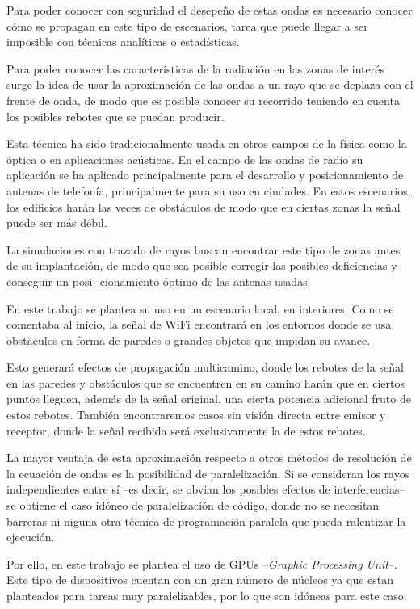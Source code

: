 Para poder conocer con seguridad el desepeño de estas ondas es necesario conocer cómo se propagan en este tipo de escenarios, tarea que puede llegar a ser imposible con técnicas analíticas o estadísticas.

Para poder conocer las características de la radiación en las zonas de interés surge la idea de usar la aproximación de las ondas a un rayo que se deplaza con el frente de onda, de modo que es posible conocer su recorrido teniendo en cuenta los posibles rebotes que se puedan producir. 

Esta técnica ha sido tradicionalmente usada en otros campos de la física como la óptica o en aplicaciones acústicas.
En el campo de las ondas de radio su aplicación se ha aplicado principalmente para el desarrollo y posicionamiento de antenas de telefonía, principalmente para su uso en ciudades. En estos escenarios, los edificios harán las veces de obstáculos de modo que en ciertas zonas la señal puede ser más débil. 

La simulaciones con trazado de rayos buscan encontrar este tipo de zonas antes de su implantación, de modo que sea posible corregir las posibles deficiencias y conseguir un posi- cionamiento óptimo de las antenas usadas.

En este trabajo se plantea su uso en un escenario local, en interiores. Como se comentaba al inicio, la señal de WiFi encontrará en los entornos donde se usa obstáculos en forma de paredes o grandes objetos que impidan su avance.

Esto generará efectos de propagación multicamino, donde los rebotes de la señal en las paredes y obstáculos que se encuentren en su camino harán que en ciertos puntos lleguen, además de la señal original, una cierta potencia adicional fruto de estos rebotes.
También encontraremos casos sin visión directa entre emisor y receptor, donde la señal recibida será exclusivamente la de estos rebotes.

La mayor ventaja de esta aproximación respecto a otros métodos de resolución de la ecuación de ondas es la posibilidad de paralelización.
Si se consideran los rayos independientes entre sí --es decir, se obvian los posibles efectos de interferencias-- se obtiene el caso idóneo de paralelización de código, donde no se necesitan barreras ni niguna otra técnica de programación paralela que pueda ralentizar la ejecución.

Por ello, en este trabajo se plantea el uso de GPUs --\textit{Graphic Processing Unit}--.
Este tipo de dispositivos cuentan con un gran número de núcleos ya que estan planteados para tareas muy paralelizables, por lo que son idóneas para este caso.

